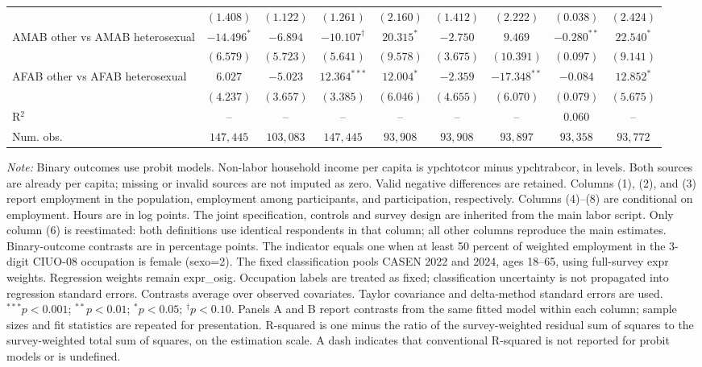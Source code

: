 \begin{table}[htpb!]
{\begin{tabular}{l c c c c c c c c}
 & $(1.408)$ & $(1.122)$ & $(1.261)$ & $(2.160)$ & $(1.412)$ & $(2.222)$ & $(0.038)$ & $(2.424)$ \\
AMAB other vs AMAB heterosexual & $-14.496^{*}$ & $-6.894$ & $-10.107^{\dagger}$ & $20.315^{*}$ & $-2.750$ & $9.469$ & $-0.280^{**}$ & $22.540^{*}$ \\
 & $(6.579)$ & $(5.723)$ & $(5.641)$ & $(9.578)$ & $(3.675)$ & $(10.391)$ & $(0.097)$ & $(9.141)$ \\
AFAB other vs AFAB heterosexual & $6.027$ & $-5.023$ & $12.364^{***}$ & $12.004^{*}$ & $-2.359$ & $-17.348^{**}$ & $-0.084$ & $12.852^{*}$ \\
 & $(4.237)$ & $(3.657)$ & $(3.385)$ & $(6.046)$ & $(4.655)$ & $(6.070)$ & $(0.079)$ & $(5.675)$ \\
\hline
R$^2$ & -- & -- & -- & -- & -- & -- & $0.060$ & -- \\
Num. obs. & $147,445$ & $103,083$ & $147,445$ & $93,908$ & $93,908$ & $93,897$ & $93,358$ & $93,772$ \\
\hline
\end{tabular}%
}
\par\vspace{1ex}
\begin{minipage}{\textwidth}\footnotesize\raggedright
\textit{Note:} Binary outcomes use probit models. Non-labor household income per capita is ypchtotcor minus ypchtrabcor, in levels. Both sources are already per capita; missing or invalid sources are not imputed as zero. Valid negative differences are retained. Columns (1), (2), and (3) report employment in the population, employment among participants, and participation, respectively. Columns (4)--(8) are conditional on employment. Hours are in log points. The joint specification, controls and survey design are inherited from the main labor script. Only column (6) is reestimated: both definitions use identical respondents in that column; all other columns reproduce the main estimates. Binary-outcome contrasts are in percentage points. The indicator equals one when at least 50 percent of weighted employment in the 3-digit CIUO-08 occupation is female (sexo=2). The fixed classification pools CASEN 2022 and 2024, ages 18--65, using full-survey expr weights. Regression weights remain expr\_osig. Occupation labels are treated as fixed; classification uncertainty is not propagated into regression standard errors. Contrasts average over observed covariates. Taylor covariance and delta-method standard errors are used. $^{***}p<0.001$; $^{**}p<0.01$; $^{*}p<0.05$; $^{\dagger}p<0.10$. Panels A and B report contrasts from the same fitted model within each column; sample sizes and fit statistics are repeated for presentation. R-squared is one minus the ratio of the survey-weighted residual sum of squares to the survey-weighted total sum of squares, on the estimation scale. A dash indicates that conventional R-squared is not reported for probit models or is undefined.
\end{minipage}
\end{table}
